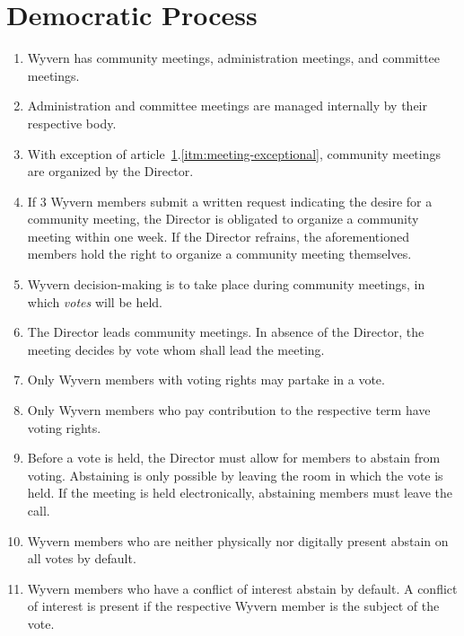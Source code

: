\section{Democratic Process}
\label{sec:democratic-process}
\begin{enumerate}
    \item Wyvern has community meetings, administration meetings, and committee meetings.
    
    \item Administration and committee meetings are managed internally by their respective body.

    \item With exception of article~\ref{sec:democratic-process}.\ref{itm:meeting-exceptional}, community meetings are organized by the Director.
    
    \item \label{itm:meeting-exceptional} If 3 Wyvern members submit a written request indicating the desire for a community meeting, the Director is obligated to organize a community meeting within one week. If the Director refrains, the aforementioned members hold the right to organize a community meeting themselves.

    \item Wyvern decision-making is to take place during community meetings, in which \emph{votes} will be held.
    
    \item The Director leads community meetings. In absence of the Director, the meeting decides by vote whom shall lead the meeting.

    \item Only Wyvern members with voting rights may partake in a vote.
    
    \item Only Wyvern members who pay contribution to the respective term have voting rights.

    \item Before a vote is held, the Director must allow for members to abstain from voting. Abstaining is only possible by leaving the room in which the vote is held. If the meeting is held electronically, abstaining members must leave the call.
    
    \item Wyvern members who are neither physically nor digitally present abstain on all votes by default.

    \item Wyvern members who have a conflict of interest abstain by default. A conflict of interest is present if the respective Wyvern member is the subject of the vote.


\end{enumerate}
